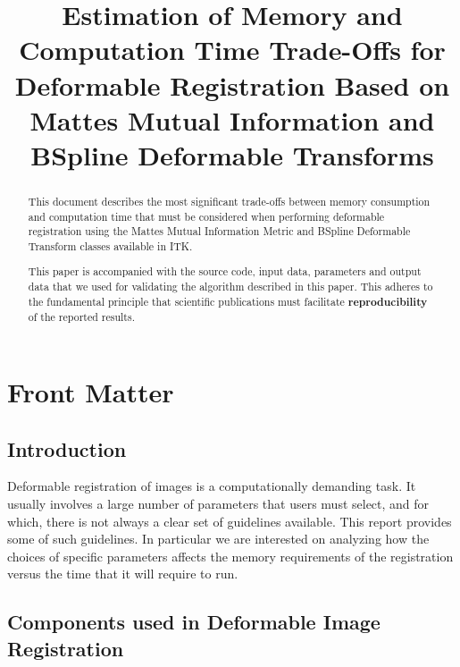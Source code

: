 \documentclass{InsightArticle}
\title{Estimation of Memory and Computation Time Trade-Offs for Deformable
Registration Based on Mattes Mutual Information and BSpline Deformable
Transforms}
\begin{document}
\ifpdf
\else
\fi


\maketitle


\ifhtml
\chapter*{Front Matter\label{front}}
\fi


\begin{abstract}
\noindent
This document describes the most significant trade-offs between memory
consumption and computation time that must be considered when performing
deformable registration using the Mattes Mutual Information Metric and BSpline
Deformable Transform classes available in ITK.

This paper is accompanied with the source code, input data, parameters and
output data that we used for validating the algorithm described in this paper.
This adheres to the fundamental principle that scientific publications must
facilitate \textbf{reproducibility} of the reported results.
\end{abstract}

\tableofcontents

\section{Introduction}

Deformable registration of images is a computationally demanding task. It
usually involves a large number of parameters that users must select, and for
which, there is not always a clear set of guidelines available. This report
provides some of such guidelines. In particular we are interested on analyzing
how the choices of specific parameters affects the memory requirements of the
registration versus the time that it will require to run.


\section{Components used in Deformable Image Registration}
\end{document}
